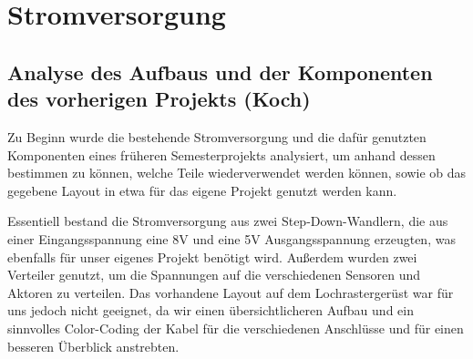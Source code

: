\chapter{Stromversorgung}

\section{Analyse des Aufbaus und der Komponenten des vorherigen Projekts (Koch)}

Zu Beginn wurde die bestehende Stromversorgung und die dafür genutzten Komponenten eines früheren Semesterprojekts analysiert, um anhand dessen bestimmen zu können, welche Teile wiederverwendet werden können, sowie ob das gegebene Layout in etwa für das eigene Projekt genutzt werden kann.

Essentiell bestand die Stromversorgung aus zwei Step-Down-Wandlern, die aus einer Eingangsspannung eine 8V und eine 5V Ausgangsspannung erzeugten, was ebenfalls für unser eigenes Projekt benötigt wird. Außerdem wurden zwei Verteiler genutzt, um die Spannungen auf die verschiedenen Sensoren und Aktoren zu verteilen.
Das vorhandene Layout auf dem Lochrastergerüst war für uns jedoch nicht geeignet, da wir einen übersichtlicheren Aufbau und ein sinnvolles Color-Coding der Kabel für die verschiedenen Anschlüsse und für einen besseren Überblick anstrebten.

